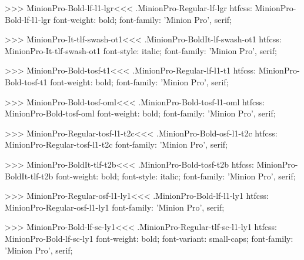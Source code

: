 {>>>
\<MinionPro-Bold-lf-l1-lgr\><<<
.MinionPro-Regular-lf-lgr
htfcss:  MinionPro-Bold-lf-l1-lgr  font-weight: bold; font-family: 'Minion Pro', serif;

>>>
\<MinionPro-It-tlf-swash-ot1\><<<
.MinionPro-BoldIt-lf-swash-ot1
htfcss:  MinionPro-It-tlf-swash-ot1  font-style: italic; font-family: 'Minion Pro', serif;

>>>
\<MinionPro-Bold-tosf-t1\><<<
.MinionPro-Regular-lf-l1-t1
htfcss:  MinionPro-Bold-tosf-t1  font-weight: bold; font-family: 'Minion Pro', serif;

>>>
\<MinionPro-Bold-tosf-oml\><<<
.MinionPro-Bold-tosf-l1-oml
htfcss:  MinionPro-Bold-tosf-oml  font-weight: bold; font-family: 'Minion Pro', serif;

>>>
\<MinionPro-Regular-tosf-l1-t2c\><<<
.MinionPro-Bold-osf-l1-t2c
htfcss:  MinionPro-Regular-tosf-l1-t2c  font-family: 'Minion Pro', serif;

>>>
\<MinionPro-BoldIt-tlf-t2b\><<<
.MinionPro-Bold-tosf-t2b
htfcss:  MinionPro-BoldIt-tlf-t2b  font-weight: bold; font-style: italic; font-family: 'Minion Pro', serif;

>>>
\<MinionPro-Regular-osf-l1-ly1\><<<
.MinionPro-Bold-lf-l1-ly1
htfcss:  MinionPro-Regular-osf-l1-ly1  font-family: 'Minion Pro', serif;

>>>
\<MinionPro-Bold-lf-sc-ly1\><<<
.MinionPro-Regular-tlf-sc-l1-ly1
htfcss:  MinionPro-Bold-lf-sc-ly1  font-weight: bold; font-variant: small-caps; font-family: 'Minion Pro', serif;

}
